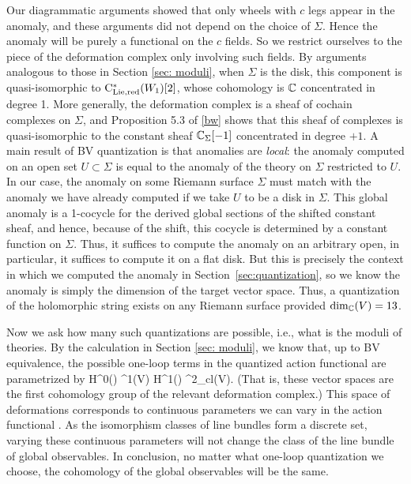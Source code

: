 Our diagrammatic arguments showed that only wheels with $c$ legs appear in the anomaly,
and these arguments did not depend on the choice of $\Sigma$. 
Hence the anomaly will be purely a functional on the $c$ fields.
So we restrict ourselves to the piece of the deformation complex only involving such fields.
By arguments analogous to those in Section \ref{sec: moduli}, 
when $\Sigma$ is the disk,
this component is quasi-isomorphic to ${\rm C}_{\rm Lie,red}^*(W_1)[2]$,
whose cohomology is $\mathbb C$ concentrated in degree 1.
More generally, the deformation complex is a sheaf of cochain complexes on $\Sigma$, 
and Proposition 5.3 of \ref{bw} shows that this sheaf of complexes is quasi-isomorphic to the constant sheaf $\mathbb C_\Sigma[-1]$ concentrated in degree $+1$. 
A main result of BV quantization \cite{CosBook}  is that anomalies are {\em local}: the anomaly computed on an open set $U \subset \Sigma$ is equal to the anomaly of the theory on $\Sigma$ restricted to $U$. 
In our case, the anomaly on some Riemann surface $\Sigma$ must match with the anomaly we have already computed if we take $U$ to be a disk in $\Sigma$.
This global anomaly is a 1-cocycle for the derived global sections of the shifted constant sheaf, 
and hence, because of the shift, this cocycle is determined by a constant function on $\Sigma$.
Thus, it suffices to compute the anomaly on an arbitrary open, 
in particular, it suffices to compute it on a flat disk. 
But this is precisely the context in which we computed the anomaly in Section~\ref{sec:quantization}, 
so we know the anomaly is simply the dimension of the target vector space.
Thus, a quantization of the holomorphic string exists on any Riemann surface provided $\dim_{\mathbb C}(V) = 13$. 

Now we ask how many such quantizations are possible,
i.e., what is the moduli of theories.
By the calculation in Section \ref{sec: moduli}, 
we know that, up to BV equivalence, 
the possible one-loop terms in the quantized action functional are parametrized by
\ben
H^0(\Sigma) \tensor \Omega^1(V) \oplus H^1(\Sigma) \tensor \Omega^2_{cl}(V).
\een 
(That is, these vector spaces are the first cohomology group of the relevant deformation complex.)
This space of deformations corresponds to continuous parameters we can vary in the action functional . 
As the isomorphism classes of line bundles form a discrete set, 
varying these continuous parameters will not change the class of the line bundle of global observables. 
In conclusion, no matter what one-loop quantization we choose, 
the cohomology of the global observables will be the same.


